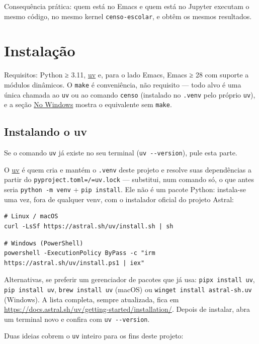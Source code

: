 \documentclass[11pt]{article}
\begin{document}
Consequência prática: quem está no Emacs e quem está no Jupyter executam o
mesmo código, no mesmo kernel \texttt{censo-escolar}, e obtêm os mesmos resultados.
\section*{Instalação}
\label{sec:orgfd0445e}

Requisitos: Python ≥ 3.11, \href{https://docs.astral.sh/uv/}{uv} e, para o lado Emacs, Emacs ≥ 28 com suporte a
módulos dinâmicos. O \texttt{make} é conveniência, não requisito — todo alvo é uma
única chamada ao \texttt{uv} ou ao comando \texttt{censo} (instalado no \texttt{.venv} pelo próprio
\texttt{uv}), e a seção \hyperref[sec:org266169a]{No Windows} mostra o equivalente sem \texttt{make}.
\subsection*{Instalando o uv}
\label{sec:orgeee09a4}

Se o comando \texttt{uv} já existe no seu terminal (\texttt{uv -{}-{}version}), pule esta parte.

O \href{https://docs.astral.sh/uv/}{uv} é quem cria e mantém o \texttt{.venv} deste projeto e resolve suas dependências
a partir do \texttt{pyproject.toml=/=uv.lock} — substitui, num comando só, o que antes
seria \texttt{python -m venv} + \texttt{pip install}. Ele não é um pacote Python: instala-se
uma vez, fora de qualquer venv, com o instalador oficial do projeto Astral:

\begin{verbatim}
# Linux / macOS
curl -LsSf https://astral.sh/uv/install.sh | sh
\end{verbatim}

\begin{verbatim}
# Windows (PowerShell)
powershell -ExecutionPolicy ByPass -c "irm https://astral.sh/uv/install.ps1 | iex"
\end{verbatim}

Alternativas, se preferir um gerenciador de pacotes que já usa: \texttt{pipx install
uv}, \texttt{pip install uv}, \texttt{brew install uv} (macOS) ou \texttt{winget install
astral-sh.uv} (Windows). A lista completa, sempre atualizada, fica em
\url{https://docs.astral.sh/uv/getting-started/installation/}. Depois de instalar,
abra um terminal novo e confira com \texttt{uv -{}-{}version}.

Duas ideias cobrem o \texttt{uv} inteiro para os fins deste projeto:
\end{document}
